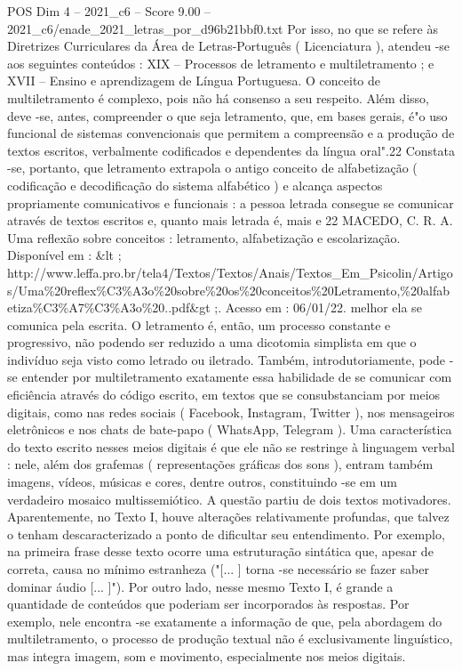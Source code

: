 \begin{textsample}{POS Dim 4 – 2021\_c6 – Score 9.00 – 2021\_c6/enade\_2021\_letras\_por\_d96b21bbf0.txt}
Por isso, no que se refere às Diretrizes Curriculares da Área de Letras-Português ( Licenciatura ), atendeu -se aos seguintes conteúdos : XIX – Processos de letramento e multiletramento ; e XVII – Ensino e aprendizagem de Língua Portuguesa.
O conceito de multiletramento é complexo, pois não há consenso a seu respeito.
Além disso, deve -se, antes, compreender o que seja letramento, que, em bases gerais, é"o uso funcional de sistemas convencionais que permitem a compreensão e a produção de textos escritos, verbalmente codificados e dependentes da língua oral".22 Constata -se, portanto, que letramento extrapola o antigo conceito de alfabetização ( codificação e decodificação do sistema alfabético ) e alcança aspectos propriamente comunicativos e funcionais : a pessoa letrada consegue se comunicar através de textos escritos e, quanto mais letrada é, mais e 22 MACEDO, C.
R.
A.
Uma reflexão sobre conceitos : letramento, alfabetização e escolarização.
Disponível em : \&lt ; http://www.leffa.pro.br/tela4/Textos/Textos/Anais/Textos\_Em\_Psicolin/Artigos/Uma\%20reflex\%C3\%A3o\%20sobre\%20os\%20conceitos\%20Letramento,\%20alfabetiza\%C3\%A7\%C3\%A3o\%20..pdf\&gt ;.
Acesso em : 06/01/22. melhor ela se comunica pela escrita.
O letramento é, então, um processo constante e progressivo, não podendo ser reduzido a uma dicotomia simplista em que o indivíduo seja visto como letrado ou iletrado.
Também, introdutoriamente, pode -se entender por multiletramento exatamente essa habilidade de se comunicar com eficiência através do código escrito, em textos que se consubstanciam por meios digitais, como nas redes sociais ( Facebook, Instagram, Twitter ), nos mensageiros eletrônicos e nos chats de bate-papo ( WhatsApp, Telegram ).
Uma característica do texto escrito nesses meios digitais é que ele não se restringe à linguagem verbal : nele, além dos grafemas ( representações gráficas dos sons ), entram também imagens, vídeos, músicas e cores, dentre outros, constituindo -se em um verdadeiro mosaico multissemiótico.
A questão partiu de dois textos motivadores.
Aparentemente, no Texto I, houve alterações relativamente profundas, que talvez o tenham descaracterizado a ponto de dificultar seu entendimento.
Por exemplo, na primeira frase desse texto ocorre uma estruturação sintática que, apesar de correta, causa no mínimo estranheza ("[... ] torna -se necessário se fazer saber dominar áudio [... ]").
Por outro lado, nesse mesmo Texto I, é grande a quantidade de conteúdos que poderiam ser incorporados às respostas.
Por exemplo, nele encontra -se exatamente a informação de que, pela abordagem do multiletramento, o processo de produção textual não é exclusivamente linguístico, mas integra imagem, som e movimento, especialmente nos meios digitais.

\end{textsample}
